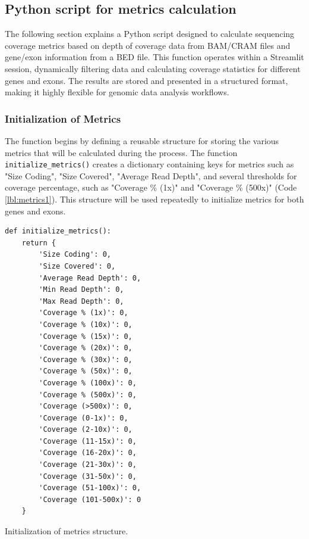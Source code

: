 \subsection{Python script for metrics calculation}

The following section explains a Python script designed to calculate sequencing coverage metrics based on depth of coverage data from BAM/CRAM files and gene/exon information from a BED file. This function operates within a Streamlit session, dynamically filtering data and calculating coverage statistics for different genes and exons. The results are stored and presented in a structured format, making it highly flexible for genomic data analysis workflows.

\subsubsection{\textbf{Initialization of Metrics}}

The function begins by defining a reusable structure for storing the various metrics that will be calculated during the process. The function \texttt{initialize\_metrics()} creates a dictionary containing keys for metrics such as "Size Coding", "Size Covered", "Average Read Depth", and several thresholds for coverage percentage, such as "Coverage \% (1x)" and "Coverage \% (500x)" (Code \ref{lbl:metrics1}). This structure will be used repeatedly to initialize metrics for both genes and exons.

\begin{longlisting}
\begin{verbatim}
def initialize_metrics():
    return {
        'Size Coding': 0,
        'Size Covered': 0,
        'Average Read Depth': 0,
        'Min Read Depth': 0,
        'Max Read Depth': 0,
        'Coverage % (1x)': 0,
        'Coverage % (10x)': 0,
        'Coverage % (15x)': 0,
        'Coverage % (20x)': 0,
        'Coverage % (30x)': 0,
        'Coverage % (50x)': 0,
        'Coverage % (100x)': 0,
        'Coverage % (500x)': 0,
        'Coverage (>500x)': 0,
        'Coverage (0-1x)': 0,
        'Coverage (2-10x)': 0,
        'Coverage (11-15x)': 0,
        'Coverage (16-20x)': 0,
        'Coverage (21-30x)': 0,
        'Coverage (31-50x)': 0,
        'Coverage (51-100x)': 0,
        'Coverage (101-500x)': 0
    }
\end{verbatim}
\caption{Initialization of metrics structure.}
\label{lbl:metrics1}
\end{longlisting}

